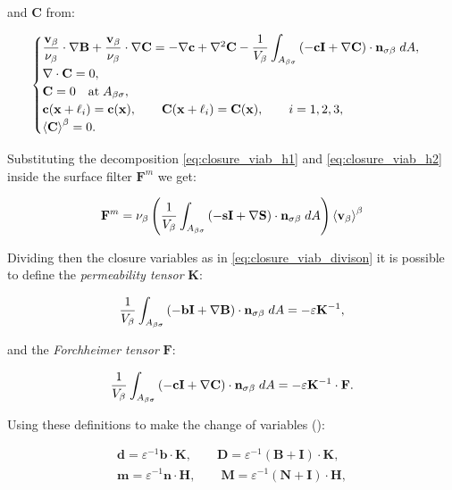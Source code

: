 and $\mathbf{C}$ from:

\begin{eqnarray}
	\begin{cases}
		\dfrac{\textbf{v}_{\beta}}{\nu_{\beta}} \cdot  \nabla \mathbf{B} +\dfrac{\textbf{v}_{\beta}}{\nu_{\beta}} \cdot  \nabla \mathbf{C} = -\nabla \mathbf{c} +  \nabla^2 \mathbf{C} - \dfrac{1}{V_\beta} \displaystyle \int_{A_{\beta \sigma}}  \left(-\mathbf{c}\mathbf{I}  +  \nabla \mathbf{C} \right) \cdot \mathbf{n}_{\sigma \beta} \;dA,  \\
		\nabla \cdot \mathbf{C} = 0, \\
		\mathbf{C} = 0 \quad \textrm{at} \; A_{\beta \sigma}, \\
		\mathbf{c}(\mathbf{x} +\ell_i) = \mathbf{c}(\mathbf{x}), \qquad \mathbf{C}(\mathbf{x} +\ell_i) = \mathbf{C}(\mathbf{x}), \qquad i=1,2,3 ,\\
		{\left< \mathbf{C} \right>}^{\beta} = 0.
	\end{cases}
\label{eq:C_problem}
\end{eqnarray}

Substituting the decomposition \eqref{eq:closure_viab_h1} and \eqref{eq:closure_viab_h2} inside the surface filter $\mathbf{F}^m$ we get:

$$
\mathbf{F}^m = \nu_{\beta} \left(\dfrac{1}{V_\beta} \int_{A_{\beta \sigma}}  \left(-\mathbf{s}\mathbf{I}  +  \nabla \mathbf{S} \right) \cdot \mathbf{n}_{\sigma \beta} \;dA \right) {\left< \textbf{v}_{\beta} \right>}^{\beta}
$$

\noindent Dividing then the closure variables as in \eqref{eq:closure_viab_divison} it is possible to define the \textit{permeability tensor} $\mathbf{K}$:

$$
 \dfrac{1}{V_\beta} \int_{A_{\beta \sigma}}  \left(-\mathbf{b}\mathbf{I}  +  \nabla \mathbf{B} \right) \cdot \mathbf{n}_{\sigma \beta} \;dA = -\varepsilon \mathbf{K}^{-1},
$$

\noindent and the \textit{Forchheimer tensor} $\mathbf{F}$:

$$
\dfrac{1}{V_\beta} \int_{A_{\beta \sigma}} \left(-\mathbf{c}\mathbf{I}  +  \nabla \mathbf{C} \right) \cdot \mathbf{n}_{\sigma \beta} \;dA = -\varepsilon \mathbf{K}^{-1} \cdot \mathbf{F}.
$$

\noindent Using these definitions to make the change of variables (\citet{barrere1992closure}):


\begin{eqnarray}
	\mathbf{d} = \varepsilon^{-1} \mathbf{b} \cdot \mathbf{K}, \qquad \mathbf{D} = \varepsilon^{-1} \left(\mathbf{B} + \mathbf{I} \right)\cdot \mathbf{K}, \\
\mathbf{m} = \varepsilon^{-1} \mathbf{n} \cdot \mathbf{H}, \qquad \mathbf{M} = \varepsilon^{-1} \left(\mathbf{N} + \mathbf{I} \right)\cdot \mathbf{H}, \label{eq:barrere2}
\end{eqnarray}


